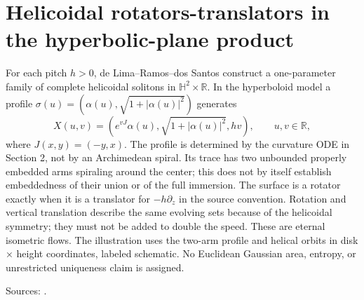 \chapter{Helicoidal rotators-translators in the hyperbolic-plane product}\label{sec:catalogue-hyperbolic-product-helicoidal}
\begin{example}\label{ex:catalogue-hyperbolic-product-helicoidal}
For each pitch $h>0$, de Lima--Ramos--dos Santos construct a one-parameter family of complete helicoidal solitons in $\mathbb H^2\times\mathbb R$. In the hyperboloid model a profile $\sigma(u)=(\alpha(u),\sqrt{1+|\alpha(u)|^2})$ generates
\[
 X(u,v)=(e^{vJ}\alpha(u),\sqrt{1+|\alpha(u)|^2},hv),\qquad u,v\in\mathbb R,
\]
where $J(x,y)=(-y,x)$. The profile is determined by the curvature ODE in Section 2, not by an Archimedean spiral. Its trace has two unbounded properly embedded arms spiraling around the center; this does not by itself establish embeddedness of their union or of the full immersion.
The surface is a rotator exactly when it is a translator for $-h\partial_z$ in the source convention. Rotation and vertical translation describe the same evolving sets because of the helicoidal symmetry; they must not be added to double the speed. These are eternal isometric flows. The illustration uses the two-arm profile and helical orbits in disk × height coordinates, labeled schematic. No Euclidean Gaussian area, entropy, or unrestricted uniqueness claim is assigned.
\par Sources: \cite{CatLimaRamosSantos2025}.
\end{example}

